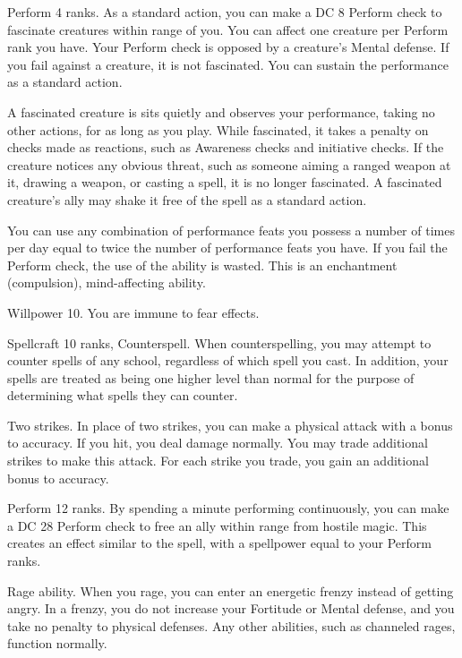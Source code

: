 \featpre Perform 4 ranks.
\featben As a standard action, you can make a DC 8 Perform check to fascinate creatures within \rngmed range of you.
You can affect one creature per Perform rank you have.
Your Perform check is opposed by a creature's Mental defense.
If you fail against a creature, it is not fascinated.
You can sustain the performance as a standard action.

A fascinated creature is sits quietly and observes your performance, taking no other actions, for as long as you play.
While fascinated, it takes a  penalty on checks made as reactions, such as Awareness checks and initiative checks.
If the creature notices any obvious threat, such as someone aiming a ranged weapon at it, drawing a weapon, or casting a spell, it is no longer fascinated.
A fascinated creature's ally may shake it free of the spell as a standard action.

You can use any combination of performance feats you possess a number of times per day equal to twice the number of performance feats you have.
If you fail the Perform check, the use of the ability is wasted.
This is an enchantment (compulsion), mind-affecting ability.

\featpre Willpower 10.
\featben You are immune to fear effects.

\featpres Spellcraft 10 ranks, Counterspell.
\featben When counterspelling, you may attempt to counter spells of any school, regardless of which spell you cast.
In addition, your spells are treated as being one higher level than normal for the purpose of determining what spells they can counter.

\featpre Two strikes.
\featben In place of two strikes, you can make a physical attack with a  bonus to accuracy.
If you hit, you deal damage normally.
You may trade additional strikes to make this attack.
For each strike you trade, you gain an additional  bonus to accuracy.

\featpre Perform 12 ranks.
\featben By spending a minute performing continuously, you can make a DC 28 Perform check to free an ally within \rngmed range from hostile magic.
This creates an effect similar to the 
spell, with a spellpower equal to your Perform ranks.

\featpre Rage ability.
\featben When you rage, you can enter an energetic frenzy instead of getting angry. In a frenzy, you do not increase your Fortitude or Mental defense, and you take no penalty to physical defenses.
Any other abilities, such as channeled rages, function normally.


